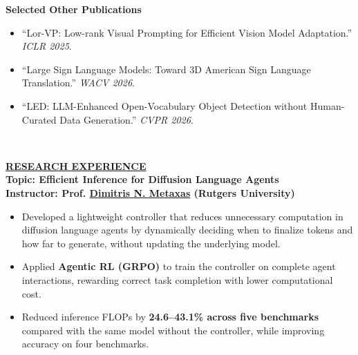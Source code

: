 \documentclass{article}
\begin{document}
\noindent \textbf{Selected Other Publications}\\[-10pt]
\begin{itemize}[noitemsep,nolistsep,leftmargin=*]

  \item ``Lor-VP: Low-rank Visual Prompting for Efficient Vision Model Adaptation.'' \emph{ICLR 2025}.\\[-10pt]

  \item ``Large Sign Language Models: Toward 3D American Sign Language Translation.'' \emph{WACV 2026}.\\[-10pt]

  \item ``LED: LLM-Enhanced Open-Vocabulary Object Detection without Human-Curated Data Generation.'' \emph{CVPR 2026}.

  
  \

\end{itemize}
\vspace{-9pt}
% 
%
\noindent \textbf{\underline{RESEARCH EXPERIENCE}} \\[1pt]
\noindent \textbf{Topic: Efficient Inference for Diffusion Language Agents}\\
\textbf{Instructor: Prof. \href{https://people.cs.rutgers.edu/~dnm/}{\color{blue}Dimitris N. Metaxas} (Rutgers University)}
\begin{itemize}[noitemsep,nolistsep,leftmargin=*]
\item Developed a lightweight controller that reduces unnecessary computation in diffusion language agents by dynamically deciding when to finalize tokens and how far to generate, without updating the underlying model.
\item Applied \textbf{Agentic RL (GRPO)} to train the controller on complete agent interactions, rewarding correct task completion with lower computational cost.
\item Reduced inference FLOPs by \textbf{24.6--43.1\% across five benchmarks} compared with the same model without the controller, while improving accuracy on four benchmarks.\\
\end{itemize}
\end{document}
